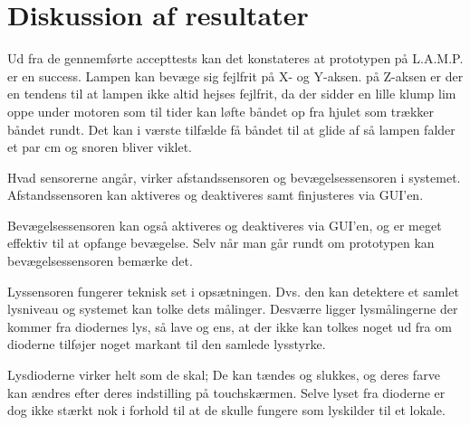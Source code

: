 \chapter{Diskussion af resultater}
Ud fra de gennemførte accepttests kan det konstateres at prototypen på L.A.M.P. er en success.
Lampen kan bevæge sig fejlfrit på X- og Y-aksen. på Z-aksen er der en tendens til at lampen ikke altid hejses fejlfrit, da der sidder en lille klump lim oppe under motoren som til tider kan løfte båndet op fra hjulet som trækker båndet rundt. Det kan i værste tilfælde få båndet til at glide af så lampen falder et par cm og snoren bliver viklet.

Hvad sensorerne angår, virker afstandssensoren og bevægelsessensoren i systemet. Afstandssensoren kan aktiveres og deaktiveres samt finjusteres via GUI'en.

Bevægelsessensoren kan også aktiveres og deaktiveres via GUI'en, og er meget effektiv til at opfange bevægelse. Selv når man går rundt om prototypen kan bevægelsessensoren bemærke det.

Lyssensoren fungerer teknisk set i opsætningen. Dvs. den kan detektere et samlet lysniveau og systemet kan tolke dets målinger. Desværre ligger lysmålingerne der kommer fra diodernes lys, så lave og ens, at der ikke kan tolkes noget ud fra om dioderne tilføjer noget markant til den samlede lysstyrke.

Lysdioderne virker helt som de skal; De kan tændes og slukkes, og deres farve kan ændres efter deres indstilling på touchskærmen. Selve lyset fra dioderne er dog ikke stærkt nok i forhold til at de skulle fungere som lyskilder til et lokale.